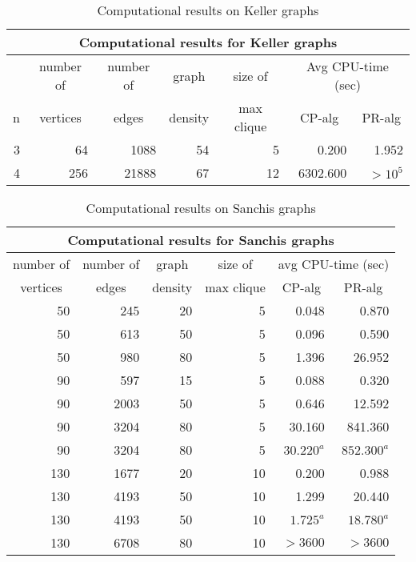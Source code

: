 \begin{table}[h]
\centering
\scriptsize
\begin{tabular}{||r|r|r|r|r|r|r||}
\hline
\multicolumn{7}{|c|}{Computational results for Keller graphs} \\
\hline \hline
& \multicolumn{1}{c|}{number of} &
\multicolumn{1}{c|}{number of} &
\multicolumn{1}{c|}{graph} &
\multicolumn{1}{c|}{size of} &
\multicolumn{2}{c|}{Avg CPU-time {\tiny (sec)}} \\ \cline{6-7}
\multicolumn{1}{||c|}{n} &
\multicolumn{1}{|c|}{vertices} &
\multicolumn{1}{|c|}{edges} &
\multicolumn{1}{|c|}{density} & 
\multicolumn{1}{|c|}{max clique} &
\multicolumn{1}{|c|}{CP-alg} &
\multicolumn{1}{|c||}{PR-alg} \\
\hline
3 & 64 & 1088 & 54 & 5 & 0.200 & 1.952\\ 
4 & 256 & 21888 & 67 & 12 & 6302.600 & $> 10^{5}$\\
\hline
\end{tabular}
\caption{Computational results on Keller graphs}
\label{tb:kell}
\end{table}

\begin{table}[h]
\scriptsize
\centering
\begin{minipage}{9.5cm}
\begin{tabular}{||r|r|r|r|r|r||}
\hline
\multicolumn{6}{|c|}{Computational results for Sanchis graphs} \\
\hline \hline
\multicolumn{1}{||c|}{number of} &
\multicolumn{1}{c|}{number of} &
\multicolumn{1}{c|}{graph} &
\multicolumn{1}{c|}{size of} &
\multicolumn{2}{c|}{avg CPU-time {\tiny (sec)}} \\ \cline{5-6}
\multicolumn{1}{||c|}{vertices} &
\multicolumn{1}{|c|}{edges} &
\multicolumn{1}{|c|}{density} & 
\multicolumn{1}{|c|}{max clique} &
\multicolumn{1}{|c|}{CP-alg} &
\multicolumn{1}{|c||}{PR-alg} \\
\hline
50 & 245 & 20 & 5 & 0.048 & 0.870\\ 
50 & 613 & 50 & 5 & 0.096 & 0.590\\ 
50 & 980 & 80 & 5 & 1.396 & 26.952\\ 
90 & 597 & 15 & 5 & 0.088 & 0.320\\ 
90 & 2003 & 50 & 5 & 0.646 & 12.592\\ 
90 & 3204 & 80 & 5 & 30.160 & 841.360\\ 
90 & 3204 & 80 & 5 & $30.220^{a}$ & $852.300^{a}$ \\
130 & 1677 & 20 & 10 & 0.200 & 0.988\\ 
130 & 4193 & 50 & 10 & 1.299 & 20.440\\ 
130 & 4193 & 50 & 10 & $1.725^{a}$ & $18.780^{a}$ \\
130 & 6708 & 80 & 10 & $> 3600$ & $> 3600$\\
\hline
\end{tabular}
\end{minipage}
\caption{Computational results on Sanchis graphs}
\label{tb:sanc}
\end{table}

